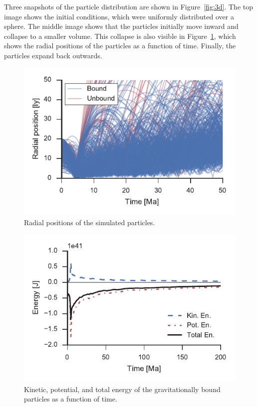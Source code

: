 \documentclass[aps,prc,reprint,floatfix,nobalancelastpage]{revtex4-1}
\begin{document}
    Three snapshots of the particle distribution are shown in Figure~\ref{fig:3d}. The top image shows the initial conditions, which were uniformly distributed over a sphere. The middle image shows that the particles initially move inward and collapse to a smaller volume. This collapse is also visible in Figure~\ref{fig:rads}, which shows the radial positions of the particles as a function of time. Finally, the particles expand back outwards.

    \begin{figure}[p]
        \centering
        \includegraphics{rads.pdf}
        \caption{Radial positions of the simulated particles.}
        \label{fig:rads}
    \end{figure}

    \begin{figure}[p]
        \centering
        \includegraphics{boundEnergy.pdf}
        \caption{Kinetic, potential, and total energy of the gravitationally bound particles as a function of time.}
        \label{fig:boundEnergy}
    \end{figure}
\end{document}
